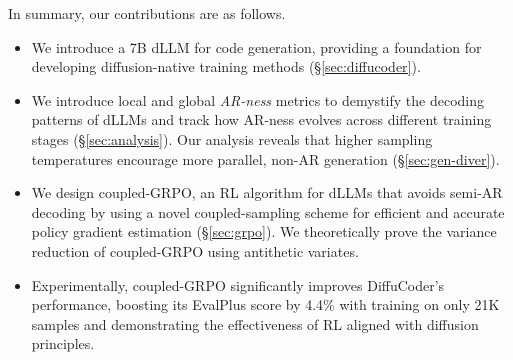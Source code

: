 In summary, our contributions are as follows.
\begin{itemize}[leftmargin=13pt]
    \item We introduce a 7B dLLM for code generation, providing a foundation for developing diffusion-native training methods (\S\ref{sec:diffucoder}).
    \item We introduce local and global \emph{AR-ness} metrics to demystify the decoding patterns of dLLMs and track how AR-ness evolves across different training stages (\S\ref{sec:analysis}). Our analysis reveals that higher sampling temperatures encourage more parallel, non-AR generation (\S\ref{sec:gen-diver}).
    \item We design coupled-GRPO, an RL algorithm for dLLMs that avoids semi-AR decoding by using a novel coupled-sampling scheme for efficient and accurate policy gradient estimation (\S\ref{sec:grpo}). We theoretically prove the variance reduction of coupled-GRPO using antithetic variates.
    \item Experimentally, coupled-GRPO significantly improves DiffuCoder's performance, boosting its EvalPlus score by 4.4\% with training on only 21K samples and demonstrating the effectiveness of RL aligned with diffusion principles.
\end{itemize} 